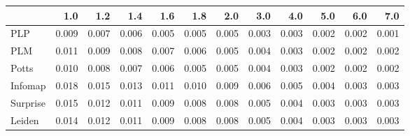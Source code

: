 \begin{tabular}{lrrrrrrrrrrr}
\toprule
{} &   1.0 &   1.2 &   1.4 &   1.6 &   1.8 &   2.0 &   3.0 &   4.0 &   5.0 &   6.0 &   7.0 \\
\midrule
PLP      & 0.009 & 0.007 & 0.006 & 0.005 & 0.005 & 0.005 & 0.003 & 0.003 & 0.002 & 0.002 & 0.001 \\
PLM      & 0.011 & 0.009 & 0.008 & 0.007 & 0.006 & 0.005 & 0.004 & 0.003 & 0.002 & 0.002 & 0.002 \\
Potts    & 0.010 & 0.008 & 0.007 & 0.006 & 0.005 & 0.005 & 0.004 & 0.003 & 0.002 & 0.002 & 0.002 \\
Infomap  & 0.018 & 0.015 & 0.013 & 0.011 & 0.010 & 0.009 & 0.006 & 0.005 & 0.004 & 0.003 & 0.003 \\
Surprise & 0.015 & 0.012 & 0.011 & 0.009 & 0.008 & 0.008 & 0.005 & 0.004 & 0.003 & 0.003 & 0.003 \\
Leiden   & 0.014 & 0.012 & 0.011 & 0.009 & 0.008 & 0.008 & 0.005 & 0.004 & 0.003 & 0.003 & 0.003 \\
\bottomrule
\end{tabular}
